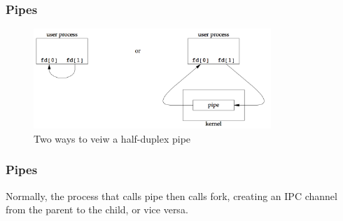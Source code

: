 \documentclass[newPxFont,sthlmFooter,nooffset]{beamer}
\begin{document}
\begin{frame}[t]
  \frametitle{Pipes}
  \begin{figure}[h]
    \centering
    \includegraphics[width=0.8\textwidth]{./figures/fig15_2-twoways.png}
    \caption{Two ways to veiw a half-duplex pipe}
  \end{figure}


\end{frame}



\begin{frame}[t]
  \frametitle{Pipes}
Normally, the process that calls pipe then calls fork, creating an IPC channel from the parent to the child, or vice versa.
  \begin{figure}[h]
    \centering

  \end{figure}

\end{frame}
\end{document}
